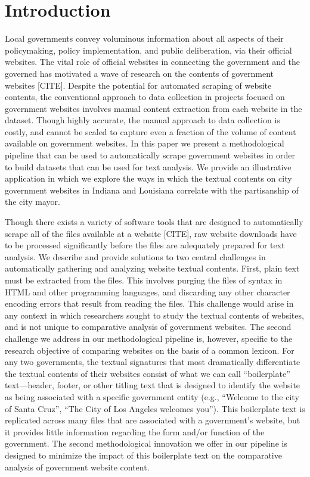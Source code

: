 \documentclass[11pt]{article}
\begin{document}
\section{Introduction}

Local governments convey voluminous information about all aspects of their policymaking, policy implementation, and public deliberation, via their official websites. The vital role of official websites in connecting the government and the governed has motivated a wave of research on the contents of government websites [CITE]. Despite the potential for automated scraping of website contents, the conventional approach to data collection in projects focused on government websites involves manual content extraction from each website in the dataset. Though highly accurate, the manual approach to data collection is costly, and cannot be scaled to capture even a fraction of the volume of content available on government websites. In this paper we present a methodological pipeline that can be used to automatically scrape government websites in order to build datasets that can be used for text analysis. We provide an illustrative application in which we explore the ways in which the textual contents on city government websites in Indiana and Louisiana correlate with the partisanship of the city mayor.

Though there exists a variety of software tools that are designed to automatically scrape all of the files available at a website [CITE], raw website downloads have to be processed significantly before the files are adequately prepared for text analysis. We describe and provide solutions to two central challenges in automatically gathering and analyzing website textual contents. First, plain text must be extracted from the files. This involves purging the files of syntax in HTML and other programming languages, and discarding any other character encoding errors that result from reading the files. This challenge would arise in any context in which researchers sought to study the textual contents of websites, and is not unique to comparative analysis of government websites. The second challenge we address in our methodological pipeline is, however, specific to the research objective of comparing websites on the basis of a common lexicon. For any two governments, the textual signatures that most dramatically differentiate the textual contents of their websites consist of what we can call ``boilerplate'' text---header, footer, or other titling text that is designed to identify the website as being associated with a specific government entity (e.g., ``Welcome to the city of Santa Cruz'', ``The City of Los Angeles welcomes you''). This boilerplate text is replicated across many files that are associated with a government's website, but it provides little information regarding the form and/or function of the government. The second methodological innovation we offer in our pipeline is designed to minimize the impact of this boilerplate text on the comparative analysis of government website content. 
\end{document}
